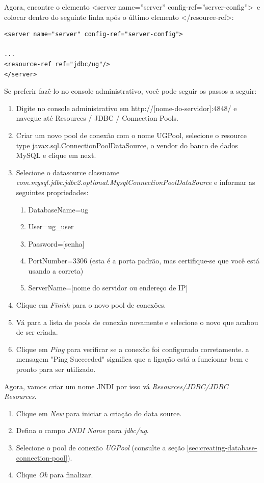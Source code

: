 \documentclass[envcountsame,envcountchap]{svmono}
\begin{document}
Agora, encontre o elemento \textless server name=''server'' config-ref=''server-config''\textgreater \ e colocar dentro do seguinte linha após o último elemento \textless /resource-ref\textgreater :

\begin{verbatim}
<server name="server" config-ref="server-config">

...
<resource-ref ref="jdbc/ug"/>
</server>
\end{verbatim}

Se preferir fazê-lo no console administrativo, você pode seguir os passos a seguir:

\begin{enumerate}
\item  Digite no console administrativo em http://[nome-do-servidor]:4848/ e navegue até Resources / JDBC / Connection Pools.
\item Criar um novo pool de conexão com o nome UGPool, selecione o resource type javax.sql.ConnectionPoolDataSource, o vendor do banco de dados MySQL e clique em next.
\item Selecione o datasource classname \\ \textit{com.mysql.jdbc.jdbc2.optional.MysqlConnectionPoolDataSource} e informar as seguintes propriedades:
   \begin{enumerate}
   \item DatabaseName=ug
   \item User=ug\_user
   \item Password=[senha]
   \item PortNumber=3306 (esta é a porta padrão, mas certifique-se
    que você está usando a correta)
   \item ServerName=[nome do servidor ou endereço de IP]
   \end{enumerate}
\item Clique em \textit{Finish} para o novo pool de conexões.
\item Vá para a lista de pools de conexão novamente e selecione o novo que acabou de ser criada.
\item Clique em \textit{Ping} para verificar se a conexão foi configurado corretamente. a mensagem "Ping Succeeded" significa que a ligação está a funcionar bem e pronto para ser utilizado.
\end{enumerate}

Agora, vamos criar um nome JNDI por isso vá \textit{Resources/JDBC/JDBC Resources}.

\begin{enumerate}
\item Clique em \textit{New} para iniciar a criação do data source.
\item Defina o campo \textit{JNDI Name} para \textit{jdbc/ug}.
\item Selecione o pool de conexão \textit{UGPool} (consulte a seção \ref{sec:creating-database-connection-pool}).
\item Clique \textit{Ok} para finalizar.
\end{enumerate}
\end{document}
